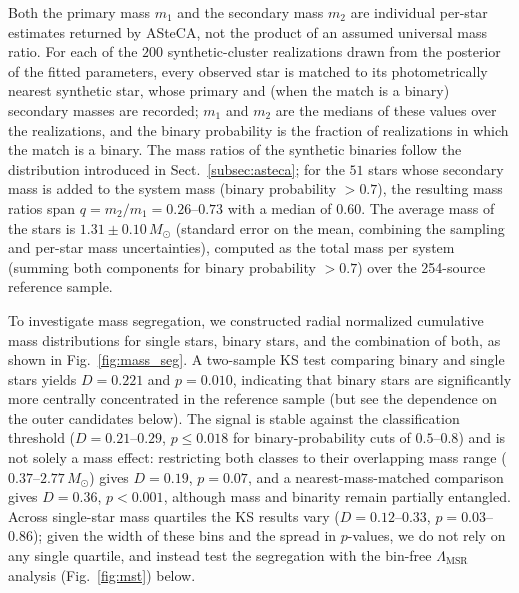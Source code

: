 \documentclass{aa}
\begin{document}
Both the primary mass $m_1$ and the secondary mass $m_2$ are individual per-star estimates returned by ASteCA, not the product of an assumed universal mass ratio. For each of the $200$ synthetic-cluster realizations drawn from the posterior of the fitted parameters, every observed star is matched to its photometrically nearest synthetic star, whose primary and (when the match is a binary) secondary masses are recorded; $m_1$ and $m_2$ are the medians of these values over the realizations, and the binary probability is the fraction of realizations in which the match is a binary. The mass ratios of the synthetic binaries follow the \citet{2013ARA&A..51..269D} distribution introduced in Sect.~\ref{subsec:asteca}; for the $51$ stars whose secondary mass is added to the system mass (binary probability $>0.7$), the resulting mass ratios span $q=m_2/m_1=0.26$--$0.73$ with a median of $0.60$. The average mass of the stars is $1.31 \pm 0.10\,M_\odot$ (standard error on the mean, combining the sampling and per-star mass uncertainties), computed as the total mass per system (summing both components for binary probability $>0.7$) over the 254-source reference sample.

To investigate mass segregation, we constructed radial normalized cumulative mass distributions for single stars, binary stars, and the combination of both, as shown in Fig.~\ref{fig:mass_seg}. A two-sample KS test comparing binary and single stars yields $D=0.221$ and $p=0.010$, indicating that binary stars are significantly more centrally concentrated in the reference sample (but see the dependence on the outer candidates below). The signal is stable against the classification threshold ($D=0.21$--$0.29$, $p\leq0.018$ for binary-probability cuts of $0.5$--$0.8$) and is not solely a mass effect: restricting both classes to their overlapping mass range ($0.37$--$2.77\,M_\odot$) gives $D=0.19$, $p=0.07$, and a nearest-mass-matched comparison gives $D=0.36$, $p<0.001$, although mass and binarity remain partially entangled. Across single-star mass quartiles the KS results vary ($D=0.12$--$0.33$, $p=0.03$--$0.86$); given the width of these bins and the spread in $p$-values, we do not rely on any single quartile, and instead test the segregation with the bin-free $\Lambda_{\mathrm{MSR}}$ analysis (Fig.~\ref{fig:mst}) below.
\end{document}
